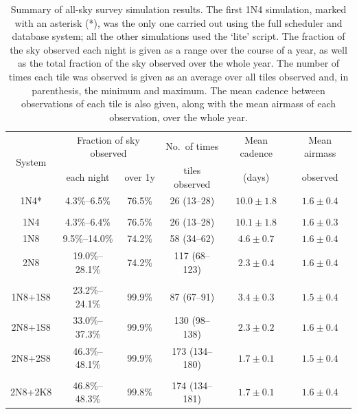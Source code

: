 \begin{colsection}
\begin{table}[t]
    \begin{center}
        \begin{tabular}{c|cc|c|c|c} %
            \multirow{2}{*}{System} &
            \multicolumn{2}{c|}{Fraction of sky observed} &
            No.\ of times &
            Mean cadence &
            {\small Mean airmass}
            \\
            &
            each night &
            over 1y &
            tiles observed &
            (days) &
            observed
            \\
            \midrule
            1N4* & 4.3\%--6.5\% & 76.5\% & 26 (13--28) & $10.0\pm1.8$ & $1.6\pm0.4$ \\
            &&&&&\\
            1N4 & 4.3\%--6.4\% & 76.5\% & 26 (13--28) & $10.1\pm1.8$ & $1.6\pm0.3$ \\
            1N8 & 9.5\%--14.0\% & 74.2\% & 58 (34--62) & $4.6\pm0.7$ & $1.6\pm0.4$ \\
            2N8 & 19.0\%--28.1\% & 74.2\% & 117 (68--123) & $2.3\pm0.4$ & $1.6\pm0.4$ \\
            &&&&&\\
            1N8+1S8 & 23.2\%--24.1\% & 99.9\% & 87 (67--91) & $3.4\pm0.3$ & $1.5\pm0.4$ \\
            2N8+1S8 & 33.0\%--37.3\% & 99.9\% & 130 (98--138) & $2.3\pm0.2$ & $1.6\pm0.4$ \\
            2N8+2S8 & 46.3\%--48.1\% & 99.9\% & 173 (134--180) & $1.7\pm0.1$ & $1.5\pm0.4$ \\
            &&&&&\\
            2N8+2K8 & 46.8\%--48.3\% & 99.8\% & 174 (134--181) & $1.7\pm0.1$ & $1.6\pm0.4$ \\
        \end{tabular}
    \end{center}
    \caption[All-sky survey simulation results summary table]{
        Summary of all-sky survey simulation results. The first 1N4 simulation, marked with an asterisk (*), was the only one carried out using the full scheduler and database system; all the other simulations used the `lite' script. The fraction of the sky observed each night is given as a range over the course of a year, as well as the total fraction of the sky observed over the whole year. The number of times each tile was observed is given as an average over all tiles observed and, in parenthesis, the minimum and maximum. The mean cadence between observations of each tile is also given, along with the mean airmass of each observation, over the whole year.
    }\label{tab:survey_sim_results}
\end{table}

\end{colsection}

